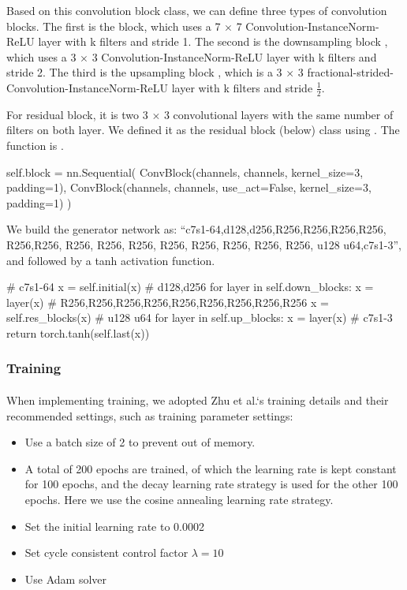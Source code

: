 Based on this convolution block class, we can define three types of convolution blocks. The first is the  block, which uses a 7 $\times$ 7 Convolution-InstanceNorm-ReLU layer with k filters and stride 1. The second is the downsampling block , which uses a 3 $\times$ 3 Convolution-InstanceNorm-ReLU layer with k filters and stride 2. The third is the upsampling block , which is a 3 $\times$ 3 fractional-strided-Convolution-InstanceNorm-ReLU layer with k filters and stride $\frac{1}{2}$.

For residual block, it is two 3 $\times$ 3 convolutional layers with the same number of filters on both layer. We defined it as the residual block (below) class using . The  function is .

\begin{python}
self.block = nn.Sequential(
    ConvBlock(channels,
              channels, 
              kernel_size=3, 
              padding=1),
    ConvBlock(channels, 
              channels, 
              use_act=False, 
              kernel_size=3, 
              padding=1)
)
\end{python}

We build the generator network as: ``c7s1-64,d128,d256,R256,R256,R256,R256, R256,R256, R256, R256, R256, R256, R256, R256, R256, R256, u128
u64,c7s1-3'', and followed by a tanh activation function.

\begin{python}
# c7s1-64
x = self.initial(x)
# d128,d256
for layer in self.down_blocks:
    x = layer(x)
# R256,R256,R256,R256,R256,R256,R256,R256,R256
x = self.res_blocks(x)
# u128 u64
for layer in self.up_blocks:
    x = layer(x)
# c7s1-3
return torch.tanh(self.last(x))
\end{python}

\subsubsection{Training}
\paragraph{}
When implementing training, we adopted Zhu et al.`s training details and their recommended settings, such as training parameter settings:

\begin{itemize}
    \item Use a batch size of 2 to prevent out of memory.
    \item A total of 200 epochs are trained, of which the learning rate is kept constant for 100 epochs, and the decay learning rate strategy is used for the other 100 epochs. Here we use the cosine annealing learning rate strategy.
    \item Set the initial learning rate to 0.0002
    \item Set cycle consistent control factor $\lambda = 10$
    \item Use Adam solver
\end{itemize}

